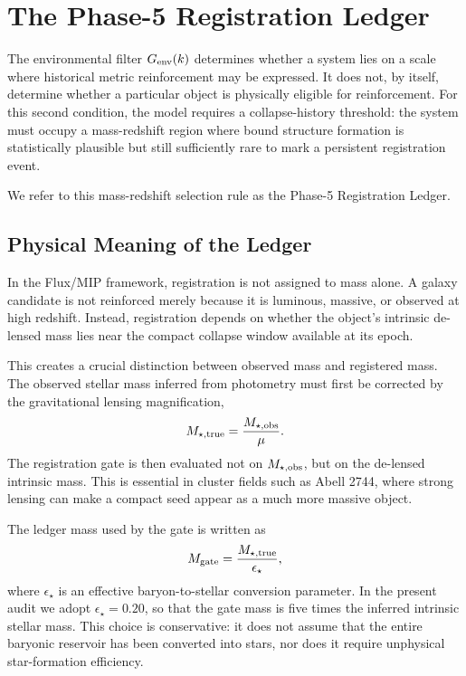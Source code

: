 \documentclass[11pt,a4paper]{article}
\begin{document}
\section{The Phase-5 Registration Ledger}

The environmental filter $G_{\rm env}(k)$ determines whether a system lies on a scale where historical metric reinforcement may be expressed. It does not, by itself, determine whether a particular object is physically eligible for reinforcement. For this second condition, the model requires a collapse-history threshold: the system must occupy a mass-redshift region where bound structure formation is statistically plausible but still sufficiently rare to mark a persistent registration event.

We refer to this mass-redshift selection rule as the Phase-5 Registration Ledger.

\subsection{Physical Meaning of the Ledger}

In the Flux/MIP framework, registration is not assigned to mass alone. A galaxy candidate is not reinforced merely because it is luminous, massive, or observed at high redshift. Instead, registration depends on whether the object's intrinsic de-lensed mass lies near the compact collapse window available at its epoch.

This creates a crucial distinction between observed mass and registered mass. The observed stellar mass inferred from photometry must first be corrected by the gravitational lensing magnification,
\begin{equation}
M_{\star,\rm true}=\frac{M_{\star,\rm obs}}{\mu}.
\end{equation}
The registration gate is then evaluated not on $M_{\star,\rm obs}$, but on the de-lensed intrinsic mass. This is essential in cluster fields such as Abell 2744, where strong lensing can make a compact seed appear as a much more massive object.

The ledger mass used by the gate is written as
\begin{equation}
M_{\rm gate}=\frac{M_{\star,\rm true}}{\epsilon_\star},
\end{equation}
where $\epsilon_\star$ is an effective baryon-to-stellar conversion parameter. In the present audit we adopt $\epsilon_\star=0.20$, so that the gate mass is five times the inferred intrinsic stellar mass. This choice is conservative: it does not assume that the entire baryonic reservoir has been converted into stars, nor does it require unphysical star-formation efficiency.
\end{document}
